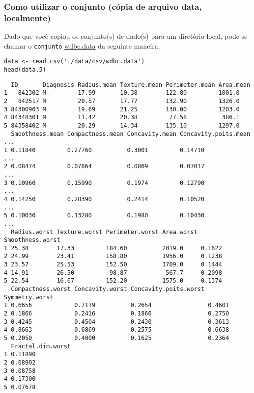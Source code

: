 \documentclass[11pt]{article}
\begin{document}
\subsubsection{Como utilizar o conjunto (cópia de arquivo data, localmente)}
\label{sec:org1fc8104}

Dado que você copiou os conjunto(s) de dado(s) para um diretório
local, pode-se chamar o \texttt{conjunto} \href{https://drive.google.com/file/d/14WFx8oXCYst\_QPySIfuii660A93xg4pg/view?usp=sharing}{wdbc.data} da seguinte maneira.

\begin{verbatim}
data <- read.csv('./data/csv/wdbc.data')
head(data,5)
\end{verbatim}

\begin{verbatim}
  ID       Diagnosis Radius.mean Texture.mean Perimeter.mean Area.mean
1   842302 M         17.99       10.38        122.80         1001.0   
2   842517 M         20.57       17.77        132.90         1326.0   
3 84300903 M         19.69       21.25        130.00         1203.0   
4 84348301 M         11.42       20.38         77.58          386.1   
5 84358402 M         20.29       14.34        135.10         1297.0   
  Smoothness.mean Compactness.mean Concavity.mean Concavity.poits.mean ...
1 0.11840         0.27760          0.3001         0.14710              ...
2 0.08474         0.07864          0.0869         0.07017              ...
3 0.10960         0.15990          0.1974         0.12790              ...
4 0.14250         0.28390          0.2414         0.10520              ...
5 0.10030         0.13280          0.1980         0.10430              ...
  Radius.worst Texture.worst Perimeter.worst Area.worst Smoothness.worst
1 25.38        17.33         184.60          2019.0     0.1622          
2 24.99        23.41         158.80          1956.0     0.1238          
3 23.57        25.53         152.50          1709.0     0.1444          
4 14.91        26.50          98.87           567.7     0.2098          
5 22.54        16.67         152.20          1575.0     0.1374          
  Compactness.worst Concavity.worst Concavity.poits.worst Symmetry.worst
1 0.6656            0.7119          0.2654                0.4601        
2 0.1866            0.2416          0.1860                0.2750        
3 0.4245            0.4504          0.2430                0.3613        
4 0.8663            0.6869          0.2575                0.6638        
5 0.2050            0.4000          0.1625                0.2364        
  Fractal.dim.worst
1 0.11890          
2 0.08902          
3 0.08758          
4 0.17300          
5 0.07678          
\end{verbatim}
\clearpage
\end{document}
